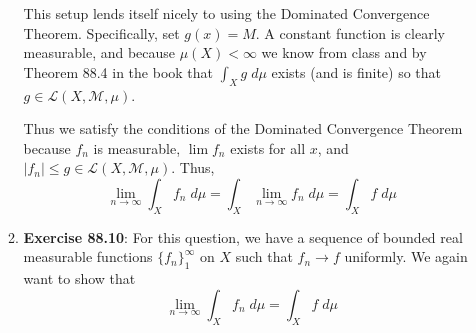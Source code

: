 \documentclass[12pt]{article}
\theoremstyle{plain}
\theoremstyle{definition}
\theoremstyle{remark}
\begin{document}
\begin{enumerate}
\begin{enumerate}
This setup lends itself nicely to using the Dominated Convergence Theorem.  Specifically, set $g(x)=M$. A constant function is clearly measurable, and because $\mu(X)<\infty$ we know from class and by Theorem 88.4 in the book that $\int_X g \; d\mu$ exists (and is finite) so that $g\in\mathscr{L}(X,\mathscr{M},\mu)$.

Thus we satisfy the conditions of the Dominated Convergence Theorem because $f_n$ is measurable, $\lim f_n$ exists for all $x$, and $|f_n|\leq g\in\mathscr{L}(X,\mathscr{M},\mu)$. Thus, 
\[
  \lim_{n\rightarrow\infty} \int_X f_n \; d\mu  
  = \int_X \lim_{n\rightarrow\infty} f_n \; d\mu
  = \int_X  f \; d\mu
\]

\item \textbf{Exercise 88.10}: For this question, we have a sequence of bounded real measurable functions $\{f_n\}^\infty_1$ on $X$ such that $f_n\rightarrow f$ uniformly. We again want to show that 
\begin{equation}
    \lim_{n\rightarrow\infty} \int_X f_n \; d\mu
    = \int_X f \; d\mu
\end{equation}
    

\end{enumerate}
\end{enumerate}
\end{document}
